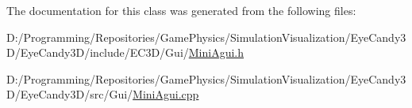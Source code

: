 The documentation for this class was generated from the following files\+:\begin{DoxyCompactItemize}
\item 
D\+:/\+Programming/\+Repositories/\+Game\+Physics/\+Simulation\+Visualization/\+Eye\+Candy3\+D/\+Eye\+Candy3\+D/include/\+E\+C3\+D/\+Gui/\mbox{\hyperlink{_mini_agui_8h}{Mini\+Agui.\+h}}\item 
D\+:/\+Programming/\+Repositories/\+Game\+Physics/\+Simulation\+Visualization/\+Eye\+Candy3\+D/\+Eye\+Candy3\+D/src/\+Gui/\mbox{\hyperlink{_mini_agui_8cpp}{Mini\+Agui.\+cpp}}\end{DoxyCompactItemize}
